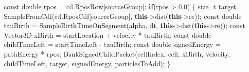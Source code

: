 \documentclass[
]{article}
\newenvironment{Shaded}{}{}
\newcommand{\AttributeTok}[1]{\textcolor[rgb]{0.49,0.56,0.16}{#1}}
\newcommand{\ControlFlowTok}[1]{\textcolor[rgb]{0.00,0.44,0.13}{\textbf{#1}}}
\newcommand{\DataTypeTok}[1]{\textcolor[rgb]{0.56,0.13,0.00}{#1}}
\newcommand{\FloatTok}[1]{\textcolor[rgb]{0.25,0.63,0.44}{#1}}
\newcommand{\KeywordTok}[1]{\textcolor[rgb]{0.00,0.44,0.13}{\textbf{#1}}}
\newcommand{\NormalTok}[1]{#1}
\newcommand{\OperatorTok}[1]{\textcolor[rgb]{0.40,0.40,0.40}{#1}}
\begin{document}
\begin{Shaded}
\begin{Highlighting}[]
    \AttributeTok{const} \DataTypeTok{double}\NormalTok{ rpos }\OperatorTok{=}\NormalTok{ cd}\OperatorTok{.}\NormalTok{RposRow}\OperatorTok{[}\NormalTok{sourceGroup}\OperatorTok{];}
    \ControlFlowTok{if}\OperatorTok{(}\NormalTok{rpos }\OperatorTok{\textgreater{}} \FloatTok{0.0}\OperatorTok{)}
    \OperatorTok{\{}
        \DataTypeTok{size\_t}\NormalTok{ target }\OperatorTok{=}\NormalTok{ SampleFromCdf}\OperatorTok{(}\NormalTok{cd}\OperatorTok{.}\NormalTok{RposCdf}\OperatorTok{[}\NormalTok{sourceGroup}\OperatorTok{],} \KeywordTok{this}\OperatorTok{{-}\textgreater{}}\NormalTok{dist}\OperatorTok{(}\KeywordTok{this}\OperatorTok{{-}\textgreater{}}\NormalTok{re}\OperatorTok{));}
        \AttributeTok{const} \DataTypeTok{double}\NormalTok{ tauBirth }\OperatorTok{=}\NormalTok{ SampleBirthTimeOnSegment}\OperatorTok{(}\NormalTok{alpha}\OperatorTok{,}\NormalTok{ dt}\OperatorTok{,} \KeywordTok{this}\OperatorTok{{-}\textgreater{}}\NormalTok{dist}\OperatorTok{(}\KeywordTok{this}\OperatorTok{{-}\textgreater{}}\NormalTok{re}\OperatorTok{));}
        \AttributeTok{const}\NormalTok{ Vector3D xBirth }\OperatorTok{=}\NormalTok{ startLocation }\OperatorTok{+}\NormalTok{ velocity }\OperatorTok{*}\NormalTok{ tauBirth}\OperatorTok{;}
        \AttributeTok{const} \DataTypeTok{double}\NormalTok{ childTimeLeft }\OperatorTok{=}\NormalTok{ startTimeLeft }\OperatorTok{{-}}\NormalTok{ tauBirth}\OperatorTok{;}
        \AttributeTok{const} \DataTypeTok{double}\NormalTok{ signedEnergy }\OperatorTok{=}\NormalTok{ pathEnergy }\OperatorTok{*}\NormalTok{ rpos}\OperatorTok{;}
\NormalTok{        BankSignedChildPacket}\OperatorTok{(}\NormalTok{cellIndex}\OperatorTok{,}\NormalTok{ cell}\OperatorTok{,}\NormalTok{ xBirth}\OperatorTok{,}\NormalTok{ velocity}\OperatorTok{,}\NormalTok{ childTimeLeft}\OperatorTok{,}\NormalTok{ target}\OperatorTok{,}\NormalTok{ signedEnergy}\OperatorTok{,}\NormalTok{ particlesToAdd}\OperatorTok{);}
    \OperatorTok{\}}


\end{Highlighting}
\end{Shaded}
\end{document}
